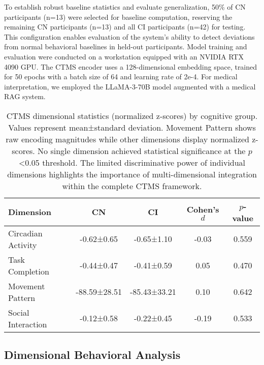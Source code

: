 \documentclass[sigconf, anonymous, 9pt, nonacm]{acmart}
\begin{document}
To establish robust baseline statistics and evaluate generalization, 50\% of CN participants (n=13) were selected for baseline computation, reserving the remaining CN participants (n=13) and all CI participants (n=42) for testing. This configuration enables evaluation of the system's ability to detect deviations from normal behavioral baselines in held-out participants.
Model training and evaluation were conducted on a workstation equipped with an NVIDIA RTX 4090 GPU. The CTMS encoder uses a 128-dimensional embedding space, trained for 50 epochs with a batch size of 64 and learning rate of 2e-4. For medical interpretation, we employed the LLaMA-3-70B model augmented with a medical RAG system.


\begin{table}[t]
\centering
\small
\begin{tabular}{lcccc}
\toprule
\textbf{Dimension} & \textbf{CN} & \textbf{CI} & \textbf{Cohen's $d$} & \textbf{$p$-value} \\
\midrule
Circadian Activity & -0.62±0.65 & -0.65±1.10 & -0.03 & 0.559 \\
Task Completion & -0.44±0.47 & -0.41±0.59 & 0.05 & 0.470 \\
Movement Pattern & -88.59±28.51 & -85.43±33.21 & 0.10 & 0.642 \\
Social Interaction & -0.12±0.58 & -0.22±0.45 & -0.19 & 0.533 \\
\bottomrule
\end{tabular}
\caption{CTMS dimensional statistics (normalized z-scores) by cognitive group. Values represent mean±standard deviation. Movement Pattern shows raw encoding magnitudes while other dimensions display normalized z-scores. No single dimension achieved statistical significance at the $p$<0.05 threshold. The limited discriminative power of individual dimensions highlights the importance of multi-dimensional integration within the complete CTMS framework.}
\label{tab:dimensional_stats}
\vspace{-3em}
\end{table}

\subsection{Dimensional Behavioral Analysis}
\end{document}
